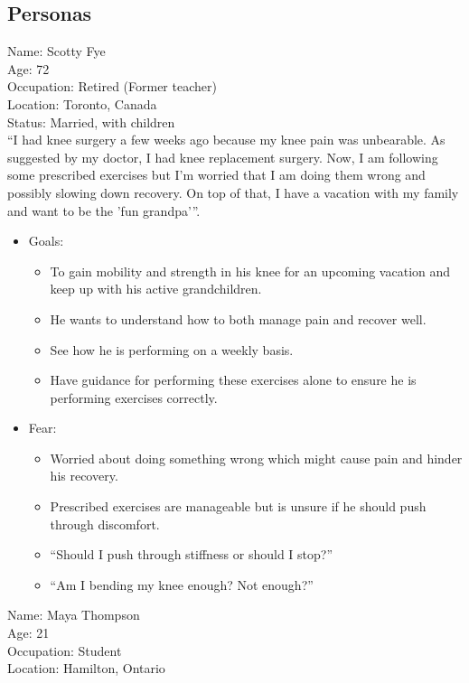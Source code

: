 \documentclass[12pt]{article}
\begin{document}
\subsection{Personas}

Name: Scotty Fye \\
Age: 72 \\
Occupation: Retired (Former teacher) \\
Location: Toronto, Canada \\
Status: Married, with children \\

\noindent “I had knee surgery a few weeks ago because my knee pain was unbearable. As suggested by my doctor, I had knee replacement surgery. Now, I am following some prescribed exercises but I’m worried that I am doing them wrong and possibly slowing down recovery. On top of that, I have a vacation with my family and want to be the \noindent 'fun grandpa'”. \\

\begin{itemize}
  \item Goals: \\
  \begin{itemize}
    \item To gain mobility and strength in his knee for an upcoming vacation and keep up with his active grandchildren.
    \item He wants to understand how to both manage pain and recover well. 
    \item See how he is performing on a weekly basis.
    \item Have guidance for performing these exercises alone to ensure he is performing exercises correctly. \\
  \end{itemize}
  \item Fear: 
  \begin{itemize}
    \item Worried about doing something wrong which might cause pain and hinder his recovery.
    \item Prescribed exercises are manageable but is unsure if he should push through discomfort.
    \item “Should I push through stiffness or should I stop?”
    \item “Am I bending my knee enough? Not enough?”
  \end{itemize}
\end{itemize}
Name: Maya Thompson\\
Age: 21 \\
Occupation: Student \\
Location: Hamilton, Ontario \\
\end{document}
